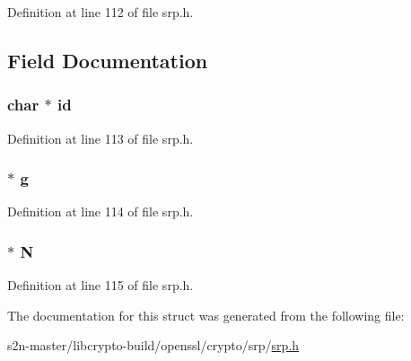Definition at line 112 of file srp.\+h.



\subsection{Field Documentation}
\subsubsection[{\texorpdfstring{id}{id}}]{\setlength{\rightskip}{0pt plus 5cm}char $\ast$ id}\hypertarget{struct_s_r_p__g_n__st_a0478f7cd8e97b1656f1b7a03ced467c4}{}\label{struct_s_r_p__g_n__st_a0478f7cd8e97b1656f1b7a03ced467c4}


Definition at line 113 of file srp.\+h.

\subsubsection[{\texorpdfstring{g}{g}}]{ $\ast$ g}\hypertarget{struct_s_r_p__g_n__st_a13fc89a0daf188f7de9a2011bc9b051f}{}\label{struct_s_r_p__g_n__st_a13fc89a0daf188f7de9a2011bc9b051f}


Definition at line 114 of file srp.\+h.

\subsubsection[{\texorpdfstring{N}{N}}]{ $\ast$ N}\hypertarget{struct_s_r_p__g_n__st_aea6e731e3cc1aef110a1dbd1545eeff0}{}\label{struct_s_r_p__g_n__st_aea6e731e3cc1aef110a1dbd1545eeff0}


Definition at line 115 of file srp.\+h.



The documentation for this struct was generated from the following file\+:\begin{DoxyCompactItemize}
\item 
s2n-\/master/libcrypto-\/build/openssl/crypto/srp/\hyperlink{crypto_2srp_2srp_8h}{srp.\+h}\end{DoxyCompactItemize}
